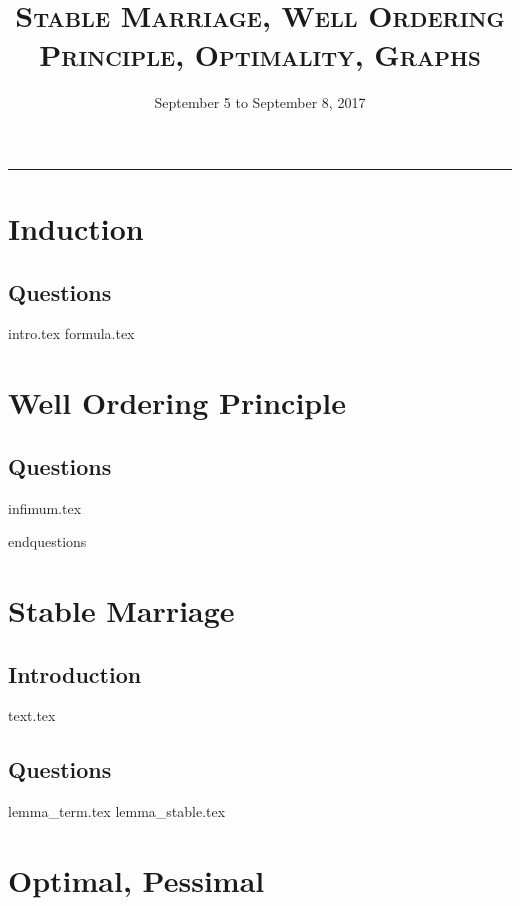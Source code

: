 \documentclass{exam}
\title{\textsc{Stable Marriage, Well Ordering Principle, Optimality, Graphs}}
\date{September 5 to September 8, 2017}
\begin{document}
\maketitle
\rule{\textwidth}{0.15em}
\fontsize{12}{15}\selectfont
\thispagestyle{empty}


\section{Induction}
\subsection{Questions}
\begin{questions}
{intro.tex}
{formula.tex}

\section{Well Ordering Principle}
\subsection{Questions}
\begin{questions}
{infimum.tex}
\end{questions}
end{questions}

\section{Stable Marriage}
\subsection{Introduction}
{text.tex}
\subsection{Questions}
\begin{questions}
{lemma_term.tex}
{lemma_stable.tex}
\end{questions}


\section{Optimal, Pessimal}

\end{questions}
\end{document}
